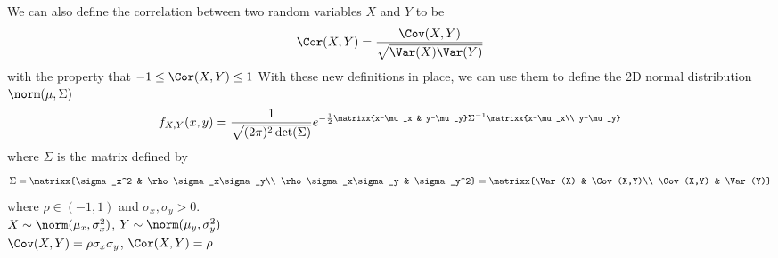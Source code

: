 We can also define the correlation between two random variables $X$ and $Y$ to be
$$\Cor(X,Y)=\frac{\Cov(X,Y)}{\sqrt{\Var(X)\Var(Y)}}$$
with the property that $-1\leq \Cor(X,Y)\leq 1$
With these new definitions in place, we can use them to define the 2D normal distribution $\norm(\mu,\Sigma)$
\[f_{X,Y}(x,y)=\frac{1}{\sqrt{(2\pi)^2\det(\Sigma)}}e^{-\frac{1}{2}\matrixx{x-\mu_x & y-\mu_y}\Sigma^{-1}\matrixx{x-\mu_x\\ y-\mu_y}}\]
where $\Sigma$ is the matrix defined by
\[\Sigma=\matrixx{\sigma_x^2 & \rho\sigma_x\sigma_y\\ \rho\sigma_x\sigma_y & \sigma_y^2}=\matrixx{\Var(X) & \Cov(X,Y)\\ \Cov(X,Y) & \Var(Y)}\]
where $\rho\in(-1,1)$ and $\sigma_x,\sigma_y>0$.\\
$X\sim\norm(\mu_x,\sigma_x^2)$, $Y\sim\norm(\mu_y,\sigma_y^2)$\\
$\Cov(X,Y)=\rho\sigma_x\sigma_y$, $\Cor(X,Y)=\rho$\\